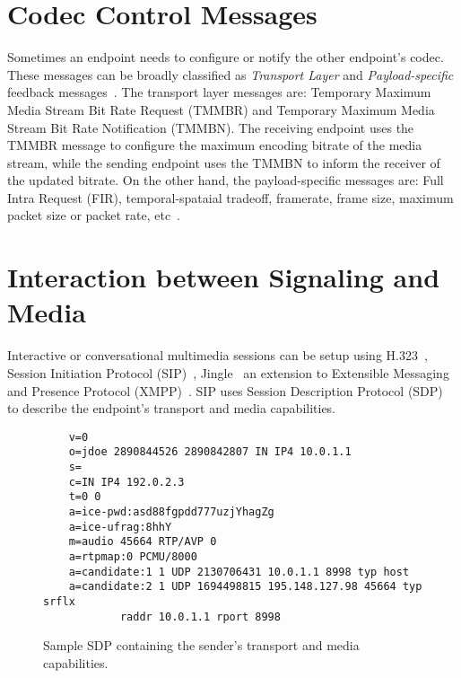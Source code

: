 

\section{Codec Control Messages}

Sometimes an endpoint needs to configure or notify the other endpoint's codec.
These messages can be broadly classified as \emph{Transport Layer} and  \emph
{Payload-specific} feedback messages~\cite{rfc5104}. The transport layer
messages are: Temporary Maximum Media Stream Bit Rate Request (TMMBR) and
Temporary Maximum Media Stream Bit Rate Notification (TMMBN). The receiving
endpoint uses the TMMBR message to configure the maximum encoding bitrate of
the media stream, while the sending endpoint uses the TMMBN to inform the
receiver of the updated bitrate. On the other hand, the payload-specific
messages are: Full Intra Request (FIR), temporal-spataial tradeoff, framerate,
frame size, maximum packet size or packet rate, etc~\cite{draft.avt.cop}.



\section{Interaction between Signaling and Media}


Interactive or conversational multimedia sessions can be setup using
H.323~\cite{H.323}, Session Initiation Protocol (SIP)~\cite{rfc3261},
Jingle~\cite{XEP-0166} an extension to Extensible Messaging and Presence
Protocol (XMPP)~\cite{rfc6120}. SIP uses Session Description Protocol
(SDP)~\cite{rfc4566} to describe the endpoint's transport and media
capabilities. 

\begin{figure}[!h]
{\small
\begin{verbatim}
    v=0
    o=jdoe 2890844526 2890842807 IN IP4 10.0.1.1
    s=
    c=IN IP4 192.0.2.3
    t=0 0
    a=ice-pwd:asd88fgpdd777uzjYhagZg
    a=ice-ufrag:8hhY
    m=audio 45664 RTP/AVP 0
    a=rtpmap:0 PCMU/8000
    a=candidate:1 1 UDP 2130706431 10.0.1.1 8998 typ host
    a=candidate:2 1 UDP 1694498815 195.148.127.98 45664 typ srflx 
            raddr 10.0.1.1 rport 8998
\end{verbatim}}
\caption{Sample SDP containing the sender's transport and media capabilities.}
\label{fig:3:sdp}
\end{figure}


